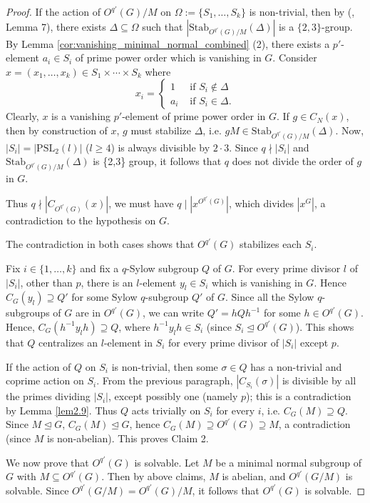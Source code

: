 \documentclass[11pt, a4paper]{article}
\numberwithin{equation}{section}
\theoremstyle{plain} %
\begin{document}
\begin{proof}
If the action of $O^{q'}(G)/M$ on $\Omega:=\{S_1,\ldots, S_k\}$ is non-trivial, then by (\cite{MR898721}, Lemma 7), there exists $\Delta\subseteq \Omega$ such that $|\mbox{Stab}_{O^{q'}(G)/M}(\Delta)|$ is a $\{2,3\}$-group. By Lemma \ref{cor:vanishing_minimal_normal_combined} (2), there exists a $p'$-element $a_i\in S_i$ of prime power order which is vanishing in $G$. Consider $x=(x_1,\ldots, x_k)\in S_1\times \cdots \times S_k$ where 
$$
x_i=
\begin{cases} 
1 & \mbox{ if } S_i\notin \Delta \\
a_i & \mbox { if } S_i\in \Delta.\end{cases}
$$  
Clearly, $x$ is a vanishing $p'$-element of prime power order in $G$. If $g\in C_N(x)$, then by construction of $x$, $g$ must stabilize $\Delta$, i.e. $gM\in  \mathrm{Stab}_{O^{q'}(G)/M}(\Delta)$. Now, $|S_i|=|\mathrm{PSL}_2(l)|$  ($l\ge 4$) is always divisible by $2\cdot 3$. Since $q \nmid |S_i|$ and $\mathrm{Stab}_{O^{q'}(G)/M}(\Delta)$ is \{2,3\} group, it follows that $q$ does not divide the order of $g$ in $G$. 

Thus $q\nmid |C_{O^{q'}(G)}(x)|$, we must have $q\mid |x^{O^{q'}(G)}|$, which divides $|x^G|$, a contradiction to the hypothesis on $G$. 


\vskip2mm
The contradiction in both cases shows that $O^{q'}(G)$ stabilizes each $S_i$.  

\vskip2mm
Fix $i\in \{1,\ldots,k\}$ and fix a $q$-Sylow subgroup $Q$ of $G$.   For every prime divisor $l$ of $|S_i|$, other than $p$, there is an $l$-element $y_l\in S_i$ which is vanishing in $G$. Hence $C_G(y_l)\supseteq Q'$ for some Sylow $q$-subgroup $Q'$ of $G$. Since all the Sylow $q$-subgroups of $G$ are in $O^{q'}(G)$, we can write $Q'=hQh^{-1}$ for some $h\in O^{q'}(G)$. Hence, $C_G(h^{-1}y_lh)\supseteq Q$, where $h^{-1}y_lh\in S_i$ (since $S_i\trianglelefteq O^{q'}(G)$).  This shows that $Q$ centralizes an $l$-element in $S_i$ for every prime divisor of $|S_i|$ except $p$. 

If the action of $Q$ on $S_i$ is non-trivial, then some $\sigma\in Q$ has a non-trivial and coprime action on $S_i$. From the previous paragraph, $|C_{S_i}(\sigma)|$ is divisible by all the primes dividing  $|S_i|$, except possibly one (namely $p$); this is a contradiction by Lemma \ref{lem2.9}. Thus $Q$ acts trivially on $S_i$ for every $i$, i.e. $C_G(M)\supseteq Q$. Since $M\trianglelefteq G$, $C_G(M)\trianglelefteq G$, hence $C_G(M)\supseteq O^{q'}(G)\supseteq M$, a contradiction (since $M$ is non-abelian).  This proves Claim 2. 

\vskip3mm 
We now prove that $O^{q'}(G)$ is solvable. Let $M$ be a minimal normal subgroup of $G$ with $M\subseteq O^{q'}(G)$. Then by above claims, $M$ is abelian, and $O^{q'}(G/M)$ is solvable. Since $O^{q'}(G/M)=O^{q'}(G)/M$, it follows that $O^{q'}(G)$ is solvable. 
\end{proof}
\end{document}
